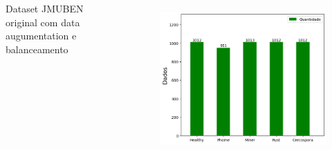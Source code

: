 \documentclass[aspectratio=169]{beamer}
\begin{document}
\begin{frame}
\begin{columns}
        \centering
        Dataset JMUBEN original com data augumentation e balanceamento
        \begin{figure}
            \centering
            \includegraphics[scale=0.39]{img/jmubenbalanceado.png}
            \label{fig:enter-label}
        \end{figure}



    \end{columns}
\end{frame}



\end{document}
